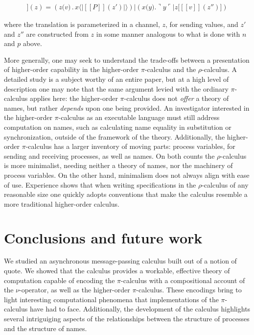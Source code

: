 \documentclass[]{amsart}
\newcommand{\ldb}{[\![}
\newcommand{\rdb}{]\!]}
\newcommand{\lliftb}{\langle\!|}
\newcommand{\rliftb}{|\!\rangle}
\newcommand{\lpquote}{\ulcorner}
\newcommand{\rpquote}{\urcorner}
\newcommand{\id}[1]{\texttt{#1}}
\newcommand{\juxtap}{\mathbin{\id{|}}}
\newcommand{\concat}{\mathbin{.}}
\newcommand{\binpar}[2]{#1 \juxtap #2}
\newcommand{\outputp}[2]{#1 \id{[} #2 \id{]}}
\newcommand{\prefix}[3]{#1 \id{(} #2 \id{)} \concat #3}
\newcommand{\lift}[2]{#1 \lliftb #2 \rliftb}
\newcommand{\dropn}[1]{\rpquote #1 \lpquote}
\newcommand{\applyp}[2]{#1 \langle #2 \rangle}
\newcommand{\absp}[2]{\id{(} #1 \id{)} #2}
\newcommand{\meaningof}[1]{\ldb #1 \rdb}
\theoremstyle{definition}
\theoremstyle{remark}
\numberwithin{equation}{subsection}
\newcommand{\pic}{$\pi$-calculus}
\newcommand{\rhoc}{$\rho$-calculus}
\begin{document}
\begin{eqnarray*}
	\meaningof{\binpar{\outputp{x}{\absp{v}{P}}}{(\prefix{x}{Y}{\applyp{Y}{v}})}}(z)
		= 
	\binpar{(\prefix{z}{v}{\lift{x}{\meaningof{P}(z')}})}
	       {(\binpar{\prefix{x}{y}{\dropn{y}}}{\outputp{z}{\meaningof{v}(z'')}})}
\end{eqnarray*}

where the translation is parameterized in a channel, $z$, for sending
values, and $z'$ and $z''$ are constructed from $z$ in some manner
analogous to what is done with $n$ and $p$ above.

More generally, one may seek to understand the trade-offs between a
presentation of higher-order capability in the higher-order {\pic} and
the {\rhoc}. A detailed study is a subject worthy of an entire paper,
but at a high level of description one may note that the same argument
levied with the ordinary {\pic} applies here: the higher-order {\pic}
does not \emph{offer} a theory of names, but rather \emph{depends}
upon one being provided. An investigator interested in the
higher-order {\pic} as an executable language must still address
computation on names, such as calculating name equality in
substitution or synchronization, outside of the framework of the
theory. Additionally, the higher-order {\pic} has a larger inventory
of moving parts: process variables, for sending and receiving
processes, as well as names. On both counts the {\rhoc} is more
minimalist, needing neither a theory of names, nor the machinery of
process variables. On the other hand, minimalism does not always align
with ease of use. Experience shows that when writing specifications in
the {\rhoc} of any reasonable size one quickly adopts conventions that
make the calculus resemble a more traditional higher-order calculus.

\section{Conclusions and future work}

We studied an asynchronous message-passing calculus built out of a
notion of quote. We showed that the calculus provides a workable,
effective theory of computation capable of encoding the {\pic} with a
compositional account of the $\nu$-operator, as well as the
higher-order {\pic}. These encodings bring to light interesting
computational phenomena that implementations of the {\pic} have had to
face. Additionally, the development of the calculus highlights several
intriguiging aspects of the relationships between the structure of
processes and the structure of names.
\end{document}
